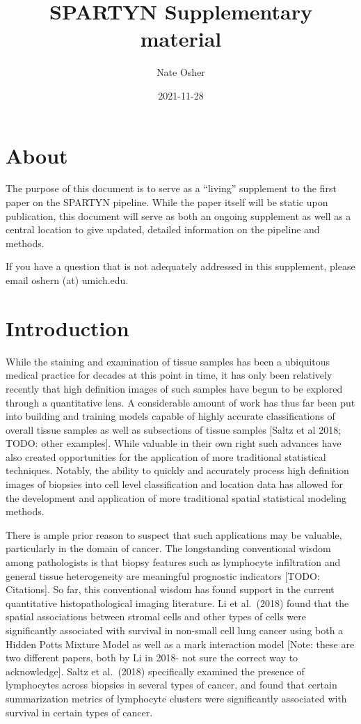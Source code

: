 \documentclass[
]{book}
\title{SPARTYN Supplementary material}
\author{Nate Osher}
\date{2021-11-28}
\begin{document}
\maketitle

{
\setcounter{tocdepth}{1}
\tableofcontents
}
\hypertarget{about}{%
\chapter{About}\label{about}}

The purpose of this document is to serve as a ``living'' supplement to the
first paper on the SPARTYN pipeline. While the paper itself will be
static upon publication, this document will serve as both an ongoing
supplement as well as a central location to give updated, detailed
information on the pipeline and methods.

If you have a question that is not adequately addressed in this
supplement, please email oshern (at) umich.edu.

\hypertarget{introduction}{%
\chapter{Introduction}\label{introduction}}

While the staining and examination of tissue samples has been a
ubiquitous medical practice for decades at this point in time, it has
only been relatively recently that high definition images of such
samples have begun to be explored through a quantitative lens. A
considerable amount of work has thus far been put into building and
training models capable of highly accurate classifications of overall
tissue samples as well as subsections of tissue samples {[}Saltz et al
2018; TODO: other examples{]}. While valuable in their own right such
advances have also created opportunities for the application of more
traditional statistical techniques. Notably, the ability to quickly and
accurately process high definition images of biopsies into cell level
classification and location data has allowed for the development and
application of more traditional spatial statistical modeling methods.

There is ample prior reason to suspect that such applications may be
valuable, particularly in the domain of cancer. The longstanding
conventional wisdom among pathologists is that biopsy features such as
lymphocyte infiltration and general tissue heterogeneity are meaningful
prognostic indicators {[}TODO: Citations{]}. So far, this conventional
wisdom has found support in the current quantitative histopathological
imaging literature. Li et al.~(2018) found that the spatial associations
between stromal cells and other types of cells were significantly
associated with survival in non-small cell lung cancer using both a
Hidden Potts Mixture Model as well as a mark interaction model {[}Note:
these are two different papers, both by Li in 2018- not sure the correct
way to acknowledge{]}. Saltz et al.~(2018) specifically examined the
presence of lymphocytes across biopsies in several types of cancer, and
found that certain summarization metrics of lymphocyte clusters were
significantly associated with survival in certain types of cancer.
\end{document}
